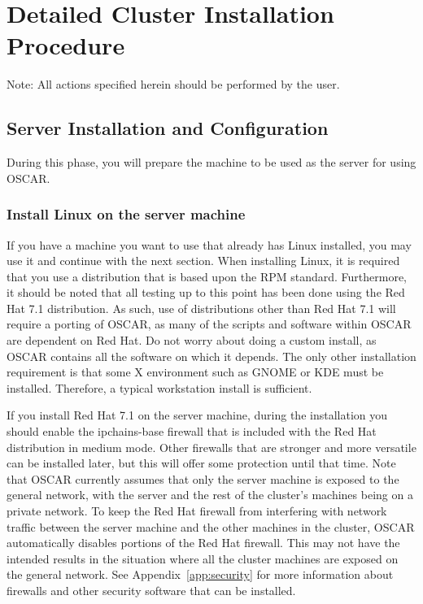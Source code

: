 %
%
%

\section{Detailed Cluster Installation Procedure}
\label{det:top}

Note: All actions specified herein should be performed by the
 user.


\subsection{Server Installation and Configuration}
\label{det:serverinstall}
  
During this phase, you will prepare the machine to be used as the
server for using OSCAR.

\subsubsection{Install Linux on the server machine} 
\label{det:serverosinstall}

If you have a machine you want to use that already has Linux
installed, you may use it and continue with the next section. When installing
Linux, it is required that you use a distribution that is based upon
the RPM standard.  Furthermore, it should be noted that all testing up
to this point has been done using the Red Hat 7.1 distribution. As
such, use of distributions other than Red Hat 7.1 will require a
porting of OSCAR, as many of the scripts and software within OSCAR are
dependent on Red Hat. Do not worry about doing a custom install, as
OSCAR contains all the software on which it depends.  The only other
installation requirement is that some X environment such as GNOME or
KDE must be installed. Therefore, a typical workstation install is
sufficient.

\begchange
If you install Red Hat 7.1 on the server machine, during the
installation you should enable the ipchains-base firewall that is 
included with the Red Hat distribution in medium mode.
Other firewalls that are stronger and more versatile can be installed
later, but this will offer some protection until that time.
Note that OSCAR currently assumes that only the server machine is
exposed to the general network, with the server and the rest of the
cluster's machines being on a private network. To keep the Red Hat
firewall from interfering with network traffic between the server
machine and the other machines in the cluster, OSCAR automatically
disables portions of the Red Hat firewall. This may not have the
intended results in the situation where all the cluster machines
are exposed on the general network.
See Appendix~\ref{app:security} for more information about firewalls
and other security software that can be installed. 
\endchange

